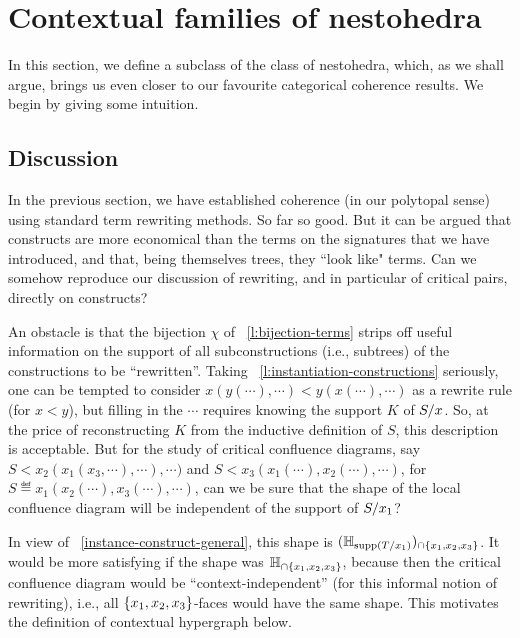 
\section{Contextual families of nestohedra} 
\label{s:contextual}

In this section, we define a subclass of the class of  nestohedra, which, as we shall argue, brings us even closer to
our favourite categorical coherence results. We begin by giving some intuition.

\subsection{Discussion} \label{contextual-discussion}

In the previous section, we have established coherence (in our polytopal sense) using standard term rewriting methods. So far so good. But  it can be argued that constructs are more economical than the terms on the signatures that we have introduced, and that, being themselves trees, they ``look like" terms. 
Can we somehow reproduce our discussion of rewriting, and in particular of critical pairs, directly on constructs?

An obstacle is that the bijection $\chi$ of~ \cref{l:bijection-terms} strips off useful information on the support of all subconstructions (i.e.,  subtrees) of the constructions to be ``rewritten''.  Taking~ \cref{l:instantiation-constructions} seriously, one can be tempted to consider $x(y(\cdots),\cdots)< y(x(\cdots),\cdots)$ as a rewrite rule (for $x<y$), but filling in the $\cdots$ requires knowing the support $K$ of $S/x$.  So, at the price of reconstructing $K$ from the inductive definition of $S$,  this description is acceptable. But for the study of critical confluence diagrams, say   $S < x_2(x_1(x_3,\cdots),\cdots),\cdots)$ and $S < x_3(x_1(\cdots),x_2(\cdots),\cdots)$, for $S\eqdef  x_1(x_2(\cdots),x_3(\cdots),\cdots)$, can we be sure that the shape of the local confluence diagram will be independent of the support of $S/x_1$?  

In view of~ \cref{instance-construct-general}, this shape is
$({\mathbb H}_{\operatorname{supp}(T/x_1)})_{\cap \left\{x_1,x_2,x_3\right\}}$.  It would be more satisfying if the shape was
${\mathbb H}_{\cap \left\{x_1,x_2,x_3\right\}}$, because then the critical confluence diagram would be ``context-independent'' (for this informal notion of rewriting), i.e., all $\left\{x_1,x_2,x_3\right\}$-faces would have the same shape.
This motivates the definition of contextual hypergraph below. 



